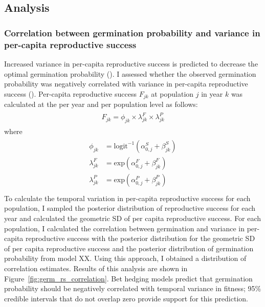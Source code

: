 \documentclass[12pt, oneside, titlepage]{article}   	%
\begin{document}
\subsection*{Analysis}
\subsubsection*{Correlation between germination probability and variance in per-capita reproductive success}

Increased variance in per-capita reproductive success is predicted to decrease the optimal germination probability (\cite{cohen1966,ellner1985a}). I assessed whether the observed germination probability was negatively correlated with variance in per-capita reproductive success (\cite{venable2007}). Per-capita reproductive success $F_{jk}$ at population $j$ in year $k$ was calculated at the per year and per population level as follows:
%
\begin{align}
  \begin{split}
F_{jk} = \phi_{jk} \times \lambda^F_{jk} \times \lambda^P_{jk} \label{eq:percapitars}
  \end{split}
\end{align}
%
where
%
\begin{align}
  \begin{split}
\phi_{jk} & = \mathrm{logit}^{-1}(\alpha^S_{0,j} + \beta^S_{jk}) \\
\lambda^F_{jk} & = \mathrm{exp}(\alpha^F_{0,j} + \beta^F_{jk}) \\
\lambda^P_{jk} & = \mathrm{exp}(\alpha^P_{0,j} + \beta^P_{jk}) \\
  \end{split}
\end{align}
%
To calculate the temporal variation in per-capita reproductive success for each population, I sampled the posterior distribution of reproductive success for each year and calculated the geometric SD of per capita reproductive success. For each population, I calculated the correlation between germination and variance in per-capita reproductive success with the posterior distribution for the geometric SD of per capita reproductive success and the posterior distribution of germination probability from model XX. Using this approach, I obtained a distribution of correlation estimates. Results of this analysis are shown in Figure~\ref{fig:germ_rs_correlation}. Bet hedging models predict that germination probability should be negatively correlated with temporal variance in fitness; 95\% credible intervals that do not overlap zero provide support for this prediction.
\end{document}
